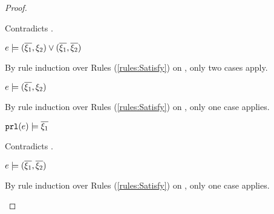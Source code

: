 \begin{proof}
\begin{byCases}
\begin{byCases}
\begin{byCases}
\begin{byCases}
\begin{byCases}
\begin{pfsteps*}
                    \end{pfsteps*}
                    Contradicts .
                \end{byCases}
            \item[\text{(\ref{rule:CSOr2})}]
                \begin{pfsteps*}
                \item $e \models (\overline{\xi_1} , \xi_2) \vee (\overline{\xi_1} , \overline{\xi_2})$  
                \end{pfsteps*}
                By rule induction over Rules (\ref{rules:Satisfy}) on , only two cases apply.
                \begin{byCases}
                \item[\text{(\ref{rule:CSOr1})}]
                    \begin{pfsteps*}
                    \item $e \models (\overline{\xi_1} , \xi_2)$  
                    \end{pfsteps*}
                    By rule induction over Rules (\ref{rules:Satisfy}) on , only one case applies.
                    \begin{byCases}
                    \item[\text{(\ref{rule:CSNotValPair})}]
                        \begin{pfsteps*}
                        \item $\mathtt{prl}(e) \models \overline{\xi_1}$ 
                        \end{pfsteps*}
                        Contradicts .
                    \end{byCases}
                \item[\text{(\ref{rule:CSOr2})}]
                    \begin{pfsteps*}
                    \item $e \models (\overline{\xi_1} , \overline{\xi_2})$  
                    \end{pfsteps*}
                    By rule induction over Rules (\ref{rules:Satisfy}) on , only one case applies.

\end{byCases}
\end{byCases}
\end{byCases}
\end{byCases}
\end{byCases}
\end{proof}
